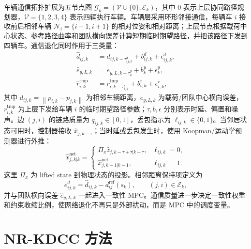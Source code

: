 \documentclass[twocolumn,3p,times,procedia]{elsarticle}
\newif\ifNRReview
\newcommand{\reviewblock}[1]{\ifNRReview\par\smallskip\noindent\begingroup\setlength{\fboxsep}{4pt}\colorbox{yellow!35}{\parbox{0.96\linewidth}{\footnotesize\textbf{当前不足：} #1}}\endgroup\par\smallskip\fi}
\newcommand{\Method}{NR-KDCC}
\newcommand{\norm}[1]{\left\lVert #1 \right\rVert}
\begin{document}
车辆通信拓扑扩展为五节点图 $\mathcal G_k=(\mathcal V\cup\{0\},\mathcal E_k)$，其中 $0$ 表示上层协同路径规划器，$\mathcal V=\{1,2,3,4\}$ 表示四辆执行车辆。车辆层采用环形邻接通信，每辆车 $i$ 接收前后相邻车辆 $\mathcal N_i=\{i-1,i+1\}$ 的相对位姿和相对距离；上层节点根据载荷中心状态、参考路径曲率和团队横向误差计算短期临时期望路径，并把该路径下发到四辆车。通信退化同时作用于三类量：
\begin{equation}
\begin{aligned}
\hat d_{ij,k}&=d_{ij,k-\tau^d_{ij,k}}+b^d_{ij,k}+\epsilon^d_{ij,k},\\
\hat e_{y,L,k}&=e_{y,L,k-\tau^y_k}+b^y_k+\epsilon^y_k,\\
\hat r_{i,k}^{\mathrm{tmp}}&=r_{i,k-\tau^r_{i,k}}^{\mathrm{tmp}}+b^r_{i,k}+\epsilon^r_{i,k},
\end{aligned}
\label{eq:comm_corrupted_measurements}
\end{equation}
其中 $d_{ij,k}=\norm{p_{i,k}-p_{j,k}}$ 为相邻车辆距离，$e_{y,L,k}$ 为载荷/团队中心横向误差，$r_{i,k}^{\mathrm{tmp}}$ 为上层下发给车辆 $i$ 的临时期望路径参数；$\tau,b,\epsilon$ 分别表示时延、偏置和噪声。边 $(j,i)$ 的链路质量为 $q_{ij,k}\in[0,1]$，丢包指示为 $\ell_{ij,k}\in\{0,1\}$。当邻居状态可用时，控制器接收 $\hat x_{j,k-\tau}$；当时延或丢包发生时，使用 Koopman/运动学预测器进行外推：
\begin{equation}
\hat x_{j,k|k}^{\mathrm{net}}=
\begin{cases}
\Pi_x \hat z_{j,k-\tau+\tau|k-\tau}, & \ell_{ij,k}=0,\\
\hat x_{j,k-1|k-1}^{\mathrm{net}}, & \ell_{ij,k}=1 .
\end{cases}
\label{eq:delay_prediction}
\end{equation}
这里 $\Pi_x$ 为 lifted state 到物理状态的投影。相邻距离保持项定义为
\begin{equation}
e^{d}_{ij,k}=\hat d_{ij,k}-d^{\mathrm{ref}}_{ij}(s_k),\qquad (j,i)\in\mathcal E_k ,
\label{eq:adjacent_distance_error}
\end{equation}
并与团队横向误差 $\hat e_{y,L,k}$ 一起进入一致性 MPC。通信质量进一步决定一致性权重和约束收缩比例，使网络退化不再只是外部扰动，而是 MPC 中的调度变量。
\reviewblock{R10 最优候选已启用相邻距离保持诊断与上层--下层通信退化记录；但该候选的临时期望路径预瞄开关为关闭状态，因此“四轮转向等效上层路径预瞄”的最终闭环收益还没有形成可用数据。}

\section{\Method{} 方法}
\end{document}
